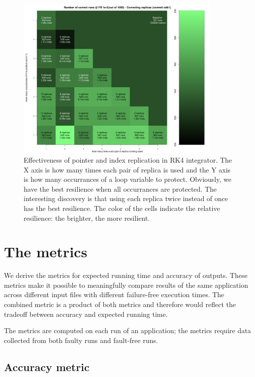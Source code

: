 \documentclass{article}
\begin{document}
\begin{figure}[h!]
\begin{center}
\includegraphics[width=10cm,natwidth=1000,natheight=800]{n_replica_correct_runs_cdb1.png}
\end{center}
\caption{Effectiveness of pointer and index replication in RK4 integrator. The X axis is how many times each pair of replica is used and the Y axis is how many occurrances of a loop variable to protect. Obviously, we have the best resilience when all occurrances are protected. The interesting discovery is that using each replica twice instead of once has the best resilience. The color of the cells indicate the relative resilience: the brighter, the more resilient.}
\label{fig:greenMtx}
\end{figure}

\section{The metrics}

We derive the metrics for expected running time and accuracy of outputs. These metrics make it possible to meaningfully compare results of the same application across different input files with different failure-free execution times. The combined metric is a product of both metrics and therefore would reflect the tradeoff between accuracy and expected running time.

The metrics are computed on each run of an application; the metrics require data collected from both faulty runs and fault-free runs.

\subsection{Accuracy metric}
\end{document}
